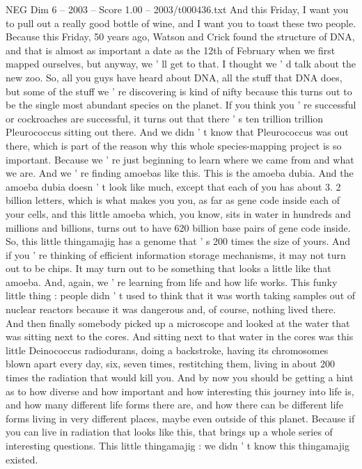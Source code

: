 \begin{textsample}{NEG Dim 6 – 2003 – Score 1.00 – 2003/t000436.txt}
And this Friday, I want you to pull out a really good bottle of wine, and I want you to toast these two people.
Because this Friday, 50 years ago, Watson and Crick found the structure of DNA, and that is almost as important a date as the 12th of February when we first mapped ourselves, but anyway, we ' ll get to that.
I thought we ' d talk about the new zoo.
So, all you guys have heard about DNA, all the stuff that DNA does, but some of the stuff we ' re discovering is kind of nifty because this turns out to be the single most abundant species on the planet.
If you think you ' re successful or cockroaches are successful, it turns out that there ' s ten trillion trillion Pleurococcus sitting out there.
And we didn ' t know that Pleurococcus was out there, which is part of the reason why this whole species-mapping project is so important.
Because we ' re just beginning to learn where we came from and what we are.
And we ' re finding amoebas like this.
This is the amoeba dubia.
And the amoeba dubia doesn ' t look like much, except that each of you has about 3. 2 billion letters, which is what makes you you, as far as gene code inside each of your cells, and this little amoeba which, you know, sits in water in hundreds and millions and billions, turns out to have 620 billion base pairs of gene code inside.
So, this little thingamajig has a genome that ' s 200 times the size of yours.
And if you ' re thinking of efficient information storage mechanisms, it may not turn out to be chips.
It may turn out to be something that looks a little like that amoeba.
And, again, we ' re learning from life and how life works.
This funky little thing : people didn ' t used to think that it was worth taking samples out of nuclear reactors because it was dangerous and, of course, nothing lived there.
And then finally somebody picked up a microscope and looked at the water that was sitting next to the cores.
And sitting next to that water in the cores was this little Deinococcus radiodurans, doing a backstroke, having its chromosomes blown apart every day, six, seven times, restitching them, living in about 200 times the radiation that would kill you.
And by now you should be getting a hint as to how diverse and how important and how interesting this journey into life is, and how many different life forms there are, and how there can be different life forms living in very different places, maybe even outside of this planet.
Because if you can live in radiation that looks like this, that brings up a whole series of interesting questions.
This little thingamajig : we didn ' t know this thingamajig existed.

\end{textsample}
